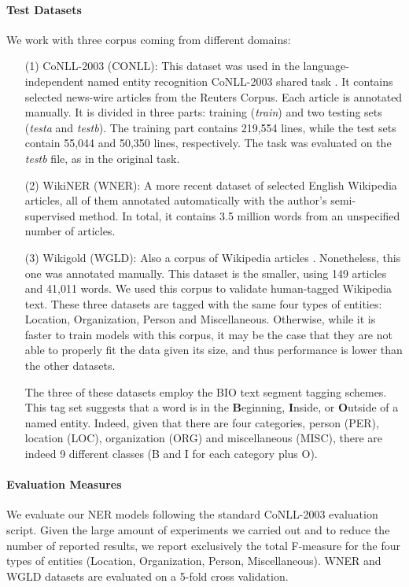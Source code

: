 \paragraph{Test Datasets}We work with three corpus coming from different domains:
\begin{itemize}
\item [(1)] CoNLL-2003 (CONLL): This dataset was used in the language-independent named entity recognition CoNLL-2003 shared task \cite{SangM03}. It contains selected news-wire articles from the Reuters Corpus. Each article is annotated manually. It is divided in three parts:  training (\textit{train}) and two testing sets (\textit{testa} and \textit{testb}). The training part contains 219,554 lines, while the test sets contain 55,044 and 50,350 lines, respectively. The task was evaluated on the \textit{testb} file, as in the original task.
\item [(2)]WikiNER (WNER): A more recent dataset \cite{Nothman2009} of selected English \allowbreak Wikipedia articles, all of them annotated automatically with the author's semi-supervised \allowbreak method. In total, it contains 3.5 million words from an unspecified number of articles. 
\item[(3)] Wikigold (WGLD): Also a corpus of Wikipedia articles \cite{Balasuriya2009}. Nonetheless, this one was annotated manually. This dataset is the smaller, using 149 articles and 41,011 words. We used this corpus to validate human-tagged Wikipedia text. These three datasets are tagged with the same four types of entities: Location, Organization, Person and Miscellaneous. Otherwise, while it is faster to train models with this corpus, it may be the case that they are not able to properly fit the data given its size, and thus performance is lower than the other datasets.

The three of these datasets employ the BIO text segment tagging schemes. This tag set suggests that a word is in the \textbf{B}eginning, \textbf{I}nside, or \textbf{O}utside of a named entity. Indeed, given that there are four categories, person (PER), location (LOC), organization (ORG) and miscellaneous (MISC), there are indeed 9 different classes (B and I for each category plus O).



\end{itemize}
%
\paragraph{Evaluation Measures}
We evaluate our NER models following the standard CoNLL-2003 evaluation script. Given the large amount of experiments we carried out and to reduce the number of reported results, we report exclusively the total F-measure for the four types of entities (Location, Organization, Person, Miscellaneous). WNER and WGLD datasets are evaluated on a 5-fold cross validation.

